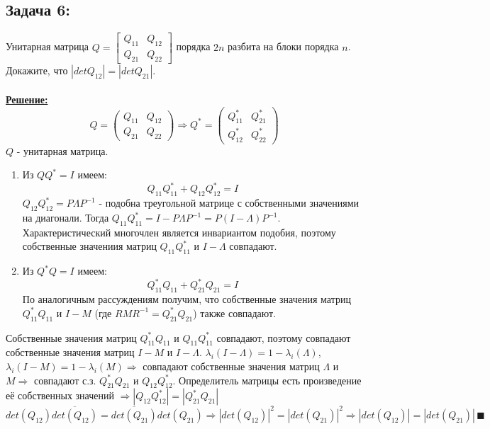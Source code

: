 \documentclass[a4paper,12pt,titlepage,final]{article}
\begin{document}
\subsection*{Задача 6:}
\noindent Унитарная матрица $Q = \left[ \begin{smallmatrix} Q_{11} & Q_{12} \\ Q_{21} & Q_{22} \end{smallmatrix}\right]$ порядка $2n$ разбита на блоки порядка $n$. Докажите, что $|detQ_{12}| = |detQ_{21}|$. \\ \\
\textbf{\underline{Решение:}} \\
$$ Q = \begin{pmatrix} Q_{11} & Q_{12} \\ Q_{21} & Q_{22} \end{pmatrix} \Rightarrow Q^* = \begin{pmatrix} Q_{11}^* & Q_{21}^* \\ Q_{12}^* & Q_{22}^* \end{pmatrix} $$
$Q$ - унитарная матрица.
\begin{enumerate}
\item Из $QQ^* = I$ имеем:
$$Q_{11}Q_{11}^* + Q_{12}Q_{12}^* = I$$
$Q_{12}Q_{12}^* = P\Lambda P^{-1}$ - подобна треугольной матрице с собственными значениями на диагонали. Тогда $Q_{11}Q_{11}^* = I - P\Lambda P^{-1} = P(I - \Lambda)P^{-1}$. 
Характеристический многочлен является инвариантом подобия, поэтому собственные значениия матриц $Q_{11}Q_{11}^*$ и $I - \Lambda$ совпадают.
\item Из $Q^*Q = I$ имеем:
$$Q_{11}^*Q_{11} + Q_{21}^*Q_{21} = I$$
По аналогичным рассуждениям получим, что собственные значения матриц $Q_{11}^*Q_{11}$ и $I - M$ (где $RMR^{-1} = Q_{21}^*Q_{21}$) также совпадают. 
\end{enumerate}
Собственные значения матриц $Q_{11}^*Q_{11}$ и $Q_{11}Q_{11}^*$ совпадают, поэтому совпадают собственные значения матриц $I - M$ и $I - \Lambda$.
$\lambda_i(I - \Lambda) = 1 - \lambda_i(\Lambda)$, $\lambda_i(I - M) = 1 - \lambda_i(M) \Rightarrow$ совпадают собственные значения матриц $\Lambda$ и $M \Rightarrow$ совпадают с.з. $Q_{21}^*Q_{21}$ и $Q_{12}Q_{12}^*$.
Определитель матрицы есть произведение её собственных значений $\Rightarrow |Q_{12}Q_{12}^*| = |Q_{21}^*Q_{21}|$
$$ det(Q_{12}) \overline{det(Q_{12})} = \overline{det(Q_{21})} det(Q_{21}) \Rightarrow |det(Q_{12})|^2 = |det(Q_{21})|^2 \Rightarrow |det(Q_{12})| = |det(Q_{21})| \, \blacksquare$$ \\
\end{document}
